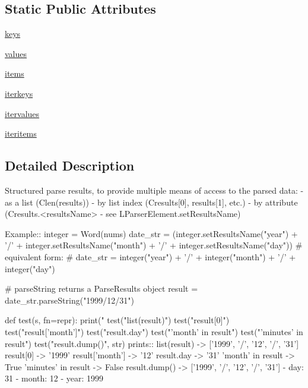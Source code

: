 \subsection*{Static Public Attributes}
\begin{DoxyCompactItemize}
\item 
\hyperlink{classsetuptools_1_1__vendor_1_1pyparsing_1_1ParseResults_ac821f70f9a2246799a0369c520939616}{keys}
\item 
\hyperlink{classsetuptools_1_1__vendor_1_1pyparsing_1_1ParseResults_aff5e1119c0e474c45b801a8ea7350dd9}{values}
\item 
\hyperlink{classsetuptools_1_1__vendor_1_1pyparsing_1_1ParseResults_afd21e25c5292f241010671485002981e}{items}
\item 
\hyperlink{classsetuptools_1_1__vendor_1_1pyparsing_1_1ParseResults_aab6a0a9a810f683946f6c4243bf4ef14}{iterkeys}
\item 
\hyperlink{classsetuptools_1_1__vendor_1_1pyparsing_1_1ParseResults_a53611e4f3a6b2934e2da03acf719fd9a}{itervalues}
\item 
\hyperlink{classsetuptools_1_1__vendor_1_1pyparsing_1_1ParseResults_ac97e3d331f289f6d9a3ab968e696b7de}{iteritems}
\end{DoxyCompactItemize}


\subsection{Detailed Description}
\begin{DoxyVerb}Structured parse results, to provide multiple means of access to the parsed data:
   - as a list (C{len(results)})
   - by list index (C{results[0], results[1]}, etc.)
   - by attribute (C{results.<resultsName>} - see L{ParserElement.setResultsName})

Example::
    integer = Word(nums)
    date_str = (integer.setResultsName("year") + '/' 
                    + integer.setResultsName("month") + '/' 
                    + integer.setResultsName("day"))
    # equivalent form:
    # date_str = integer("year") + '/' + integer("month") + '/' + integer("day")

    # parseString returns a ParseResults object
    result = date_str.parseString("1999/12/31")

    def test(s, fn=repr):
        print("%
    test("list(result)")
    test("result[0]")
    test("result['month']")
    test("result.day")
    test("'month' in result")
    test("'minutes' in result")
    test("result.dump()", str)
prints::
    list(result) -> ['1999', '/', '12', '/', '31']
    result[0] -> '1999'
    result['month'] -> '12'
    result.day -> '31'
    'month' in result -> True
    'minutes' in result -> False
    result.dump() -> ['1999', '/', '12', '/', '31']
    - day: 31
    - month: 12
    - year: 1999
\end{DoxyVerb}
 

